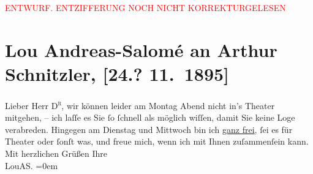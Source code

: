 
\begin{center}
            \textcolor{red}{ENTWURF. ENTZIFFERUNG NOCH NICHT KORREKTURGELESEN}
                      \end{center}
            
               \section[Lou Andreas-Salomé an Arthur Schnitzler, {[}24.? 11. 1895{]}]{ Lou Andreas-Salomé an Arthur Schnitzler, {[}24.? 11. 1895{]}}\nopagebreak{}\rehead{ }\begin{ledgroupsized}[t]{13cm}\normalsize\beginnumbering{} \toendnotes[C]{\smallbreak\pagebreak[2]} 
\pstart
           \noindent{}{\pb}Lieber Herr \textsc{D\textsuperscript{r}}, wir können leider am Montag Abend nicht in’s Theater
                    mitgehen, – ich laſſe es Sie ſo ſchnell als möglich wiſſen, damit Sie keine Loge
                    verabreden. Hingegen am Dienstag und Mittwoch bin ich
                        \uline{ganz frei}, ſei es für Theater oder ſonſt
                    was, und freue mich, wenn ich mit Ihnen zuſammenſein kann.\pend
           \pstart
           Mit herzlichen Grüßen Ihre{\\[\baselineskip]}\spacefill\mbox{LouAS.}\pend
           \leftskip=0em{}\endnumbering{}\end{ledgroupsized}  \newcommand{\dateiname}{L00515}\newcommand{\titel}{Lou Andreas-Salomé an Arthur Schnitzler, [24.? 11. 1895]}\newcommand{\editorInnen}{Martin Anton Müller und Gerd-Hermann Susen}
      
